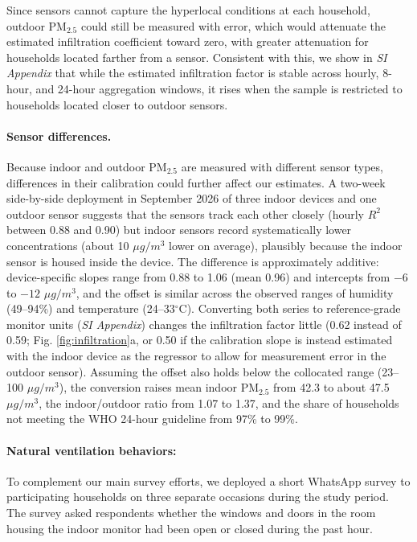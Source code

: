 \documentclass[9pt,twocolumn,twoside]{pnas-new}
\providecommand{\DIFadd}[1]{{\protect\color{red}#1}}
\begin{document}
\DIFadd{Since sensors cannot capture the hyperlocal conditions at each household, outdoor PM$_{2.5}$ could still be measured with error, which would attenuate the estimated infiltration coefficient toward zero, with greater attenuation for households located farther from a sensor. Consistent with this, we show in} \textit{\DIFadd{SI Appendix}} \DIFadd{that while the estimated infiltration factor is stable across hourly, 8-hour, and 24-hour aggregation windows, it rises when the sample is restricted to households located closer to outdoor sensors.}

\paragraph{\DIFadd{Sensor differences.}}
\DIFadd{Because indoor and outdoor PM$_{2.5}$ are measured with different sensor types, differences in their calibration could further affect our estimates. A two-week side-by-side deployment in September 2026 of three indoor devices and one outdoor sensor suggests that the sensors track each other closely (hourly $R^2$ between 0.88 and 0.90) but indoor sensors record systematically lower concentrations (about 10 $\mu g/m^3$ lower on average), plausibly because the indoor sensor is housed inside the device. 
The difference is approximately additive: device-specific slopes range from 0.88 to 1.06 (mean 0.96) and intercepts from $-6$ to $-12$ $\mu g/m^3$, and the offset is similar across the observed ranges of humidity (49--94\%) and temperature (24--33$^{\circ}$C). Converting both series to reference-grade monitor units (}\textit{\DIFadd{SI Appendix}}\DIFadd{) changes the infiltration factor little (0.62 instead of 0.59; Fig. \ref{fig:infiltration}a, or 0.50 if the calibration slope is instead estimated with the indoor device as the regressor to allow for measurement error in the outdoor sensor). Assuming the offset also holds below the collocated range (23--100 $\mu g/m^3$), the conversion raises mean indoor PM$_{2.5}$ from 42.3 to about 47.5 $\mu g/m^3$, the indoor/outdoor ratio from 1.07 to 1.37, and the share of households not meeting the WHO 24-hour guideline from 97\% to 99\%.}

\paragraph{Natural ventilation behaviors:} To complement our main survey efforts, we deployed a short WhatsApp survey to participating households on three separate occasions during the study period. The survey asked respondents whether the windows and doors in the room housing the indoor monitor had been open or closed during the past hour.
\end{document}

